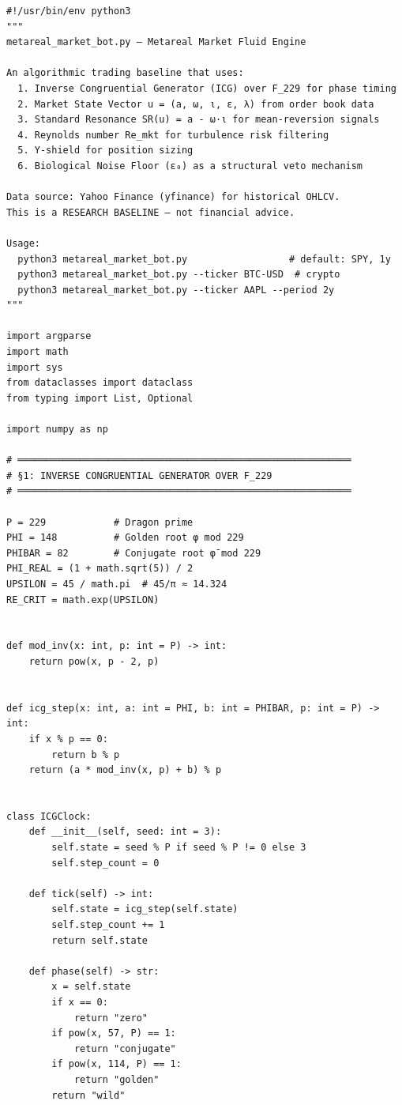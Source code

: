 \begin{verbatim}
#!/usr/bin/env python3
"""
metareal_market_bot.py — Metareal Market Fluid Engine

An algorithmic trading baseline that uses:
  1. Inverse Congruential Generator (ICG) over F_229 for phase timing
  2. Market State Vector u = (a, ω, ι, ε, λ) from order book data
  3. Standard Resonance SR(u) = a - ω·ι for mean-reversion signals
  4. Reynolds number Re_mkt for turbulence risk filtering
  5. Υ-shield for position sizing
  6. Biological Noise Floor (ε₀) as a structural veto mechanism

Data source: Yahoo Finance (yfinance) for historical OHLCV.
This is a RESEARCH BASELINE — not financial advice.

Usage:
  python3 metareal_market_bot.py                  # default: SPY, 1y
  python3 metareal_market_bot.py --ticker BTC-USD  # crypto
  python3 metareal_market_bot.py --ticker AAPL --period 2y
"""

import argparse
import math
import sys
from dataclasses import dataclass
from typing import List, Optional

import numpy as np

# ═══════════════════════════════════════════════════════════
# §1: INVERSE CONGRUENTIAL GENERATOR OVER F_229
# ═══════════════════════════════════════════════════════════

P = 229            # Dragon prime
PHI = 148          # Golden root φ mod 229
PHIBAR = 82        # Conjugate root φ̄ mod 229
PHI_REAL = (1 + math.sqrt(5)) / 2
UPSILON = 45 / math.pi  # 45/π ≈ 14.324
RE_CRIT = math.exp(UPSILON)


def mod_inv(x: int, p: int = P) -> int:
    return pow(x, p - 2, p)


def icg_step(x: int, a: int = PHI, b: int = PHIBAR, p: int = P) -> int:
    if x % p == 0:
        return b % p
    return (a * mod_inv(x, p) + b) % p


class ICGClock:
    def __init__(self, seed: int = 3):
        self.state = seed % P if seed % P != 0 else 3
        self.step_count = 0

    def tick(self) -> int:
        self.state = icg_step(self.state)
        self.step_count += 1
        return self.state

    def phase(self) -> str:
        x = self.state
        if x == 0:
            return "zero"
        if pow(x, 57, P) == 1:
            return "conjugate"  
        if pow(x, 114, P) == 1:
            return "golden"     
        return "wild"           


\end{verbatim}
